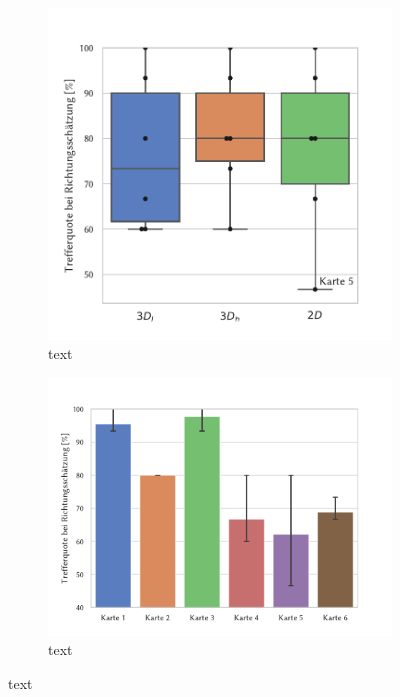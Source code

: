 \begin{figure}
    \begin{subfigure}{\linewidth}
        \centering
        \includegraphics[height=0.45\textheight]{figures/analysis/Hitrate_per_Condition}
        \caption{text}
        \label{sfig:hitrate_per_condition}
    \end{subfigure}%

    \begin{subfigure}{\linewidth}
        \centering
        \includegraphics[height=0.45\textheight]{figures/analysis/Hitrate_per_Map}
        \caption{text}
        \label{sfig:hitrate_per_map}
    \end{subfigure}
\end{figure}

